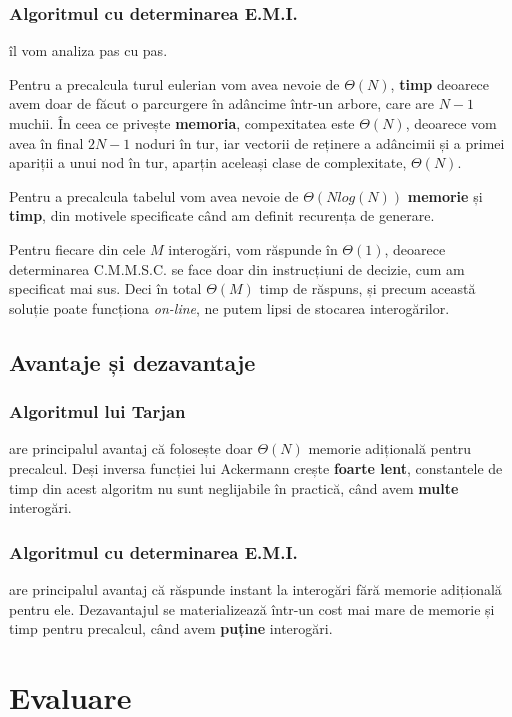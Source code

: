 \documentclass[runningheads]{llncs}
\begin{document}
\subsubsection{Algoritmul cu determinarea E.M.I.}  îl vom analiza pas cu pas.

Pentru a precalcula turul eulerian vom avea nevoie de $\Theta(N)$, \textbf{timp} deoarece avem doar de făcut o parcurgere în adâncime într-un arbore, care are $N-1$ muchii. În ceea ce privește \textbf{memoria}, compexitatea este $\Theta(N)$, deoarece vom avea în final $2N-1$ noduri în tur, iar vectorii de reținere a adâncimii și a primei apariții a unui nod în tur, aparțin aceleași clase de complexitate, $\Theta(N)$.

Pentru a precalcula tabelul vom avea nevoie de $\Theta(Nlog(N))$ \textbf{memorie} și \textbf{timp}, din motivele specificate când am definit recurența de generare.

Pentru fiecare din cele $M$ interogări, vom răspunde în $\Theta(1)$, deoarece determinarea C.M.M.S.C. se face doar din instrucțiuni de decizie, cum am specificat mai sus. Deci în total $\Theta(M)$ timp de răspuns, și precum această soluție poate funcționa \emph{on-line}, ne putem lipsi de stocarea interogărilor.

\subsection{Avantaje și dezavantaje}

\subsubsection{Algoritmul lui Tarjan} are principalul avantaj că folosește doar $\Theta(N)$ memorie adițională pentru precalcul. Deși inversa funcției lui Ackermann crește \textbf{foarte lent}, constantele de timp din acest algoritm nu sunt neglijabile în practică, când avem \textbf{multe} interogări.

\subsubsection{Algoritmul cu determinarea E.M.I.} are principalul avantaj că răspunde instant la interogări fără memorie adițională pentru ele. Dezavantajul se materializează într-un cost mai mare de memorie și timp pentru precalcul, când avem \textbf{puține} interogări.

\section{Evaluare}
\end{document}
